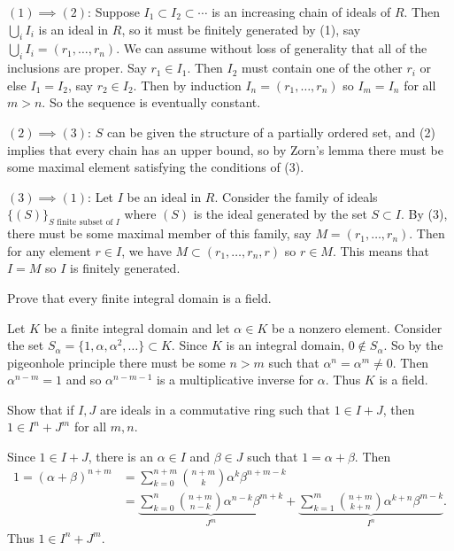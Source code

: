\documentclass[11pt,letterpaper]{article}
\begin{document}
\begin{solution}
    $(1) \implies (2)$: Suppose $I_1\subset I_2\subset \cdots$ is an increasing chain of ideals of $R$. Then $\bigcup_i I_i$ is an ideal in $R$, so it must be finitely generated by (1), say $\bigcup_i I_i=(r_1,\ldots, r_n)$. We can assume without loss of generality that all of the inclusions are proper. Say $r_1\in I_1$. Then $I_2$ must contain one of the other $r_i$ or else $I_1=I_2$, say $r_2\in I_2$. Then by induction $I_n=(r_1,\ldots, r_n)$ so $I_m=I_n$ for all $m > n$. So the sequence is eventually constant.
    
    $(2)\implies (3)$: $S$ can be given the structure of a partially ordered set, and (2) implies that every chain has an upper bound, so by Zorn's lemma there must be some maximal element satisfying the conditions of (3).
    
    $(3)\implies (1)$: Let $I$ be an ideal in $R$. Consider the family of ideals $\{(S)\}_{S\textrm{ finite subset of } I}$ where $(S)$ is the ideal generated by the set $S\subset I$. By (3), there must be some maximal member of this family, say $M=(r_1,\ldots,r_n)$. Then for any element $r\in I$, we have $M\subset (r_1,\ldots,r_n, r)$ so $r\in M$. This means that $I=M$ so $I$ is finitely generated.
\end{solution}

\begin{cproblem}{3.2}
    Prove that every finite integral domain is a field.
\end{cproblem}

\begin{solution}
    Let $K$ be a finite integral domain and let $\alpha\in K$ be a nonzero element. Consider the set $S_\alpha=\{1,\alpha, \alpha^2, \ldots\}\subset K$. Since $K$ is an integral domain, $0\not\in S_\alpha$. So by the pigeonhole principle there must be some $n>m$ such that $\alpha^n=\alpha^m\neq 0$. Then $\alpha^{n-m}=1$ and so $\alpha^{n-m-1}$ is a multiplicative inverse for $\alpha$. Thus $K$ is a field.      
\end{solution}

\begin{cproblem}{3.7}
    Show that if $I,J$ are ideals in a commutative ring such that $1\in I+J$, then $1\in I^n+J^m$ for all $m,n$.
\end{cproblem}

\begin{solution}
    Since $1\in I+J$, there is an $\alpha\in I$ and $\beta\in J$ such that $1=\alpha+\beta$. Then
    \[
        \begin{aligned}
            1=(\alpha+\beta)^{n+m}&=\sum^{n+m}_{k=0}\binom{n+m}{k}\alpha^k\beta^{n+m-k}\\
            &=\underbrace{\sum^n_{k=0}\binom{n+m}{n-k}\alpha^{n-k}\beta^{m+k}}_{J^m}+\underbrace{\sum^m_{k=1}\binom{n+m}{k+n}\alpha^{k+n}\beta^{m-k}}_{I^n}.
        \end{aligned}
    \]  
    Thus $1\in I^n+J^m$.
\end{solution}
\end{document}
